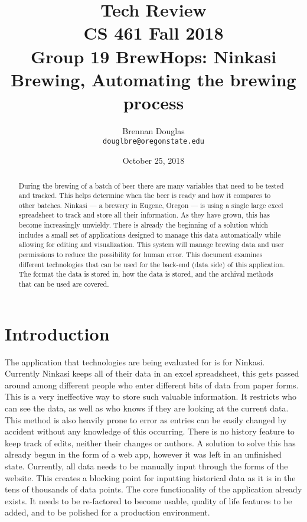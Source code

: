 \documentclass[draftclsnofoot,onecolumn,journal,letterpaper,compsoc,10pt]{IEEEtran}
\title{Tech Review\\\large CS 461 Fall 2018\\Group 19 BrewHops: Ninkasi Brewing, Automating the brewing process}
\author{
    Brennan Douglas \\
    \texttt{douglbre@oregonstate.edu}
}
\date{October 25, 2018}
\begin{document}
\begin{titlingpage}
    \maketitle
    \begin{abstract}
    	During the brewing of a batch of beer there are many variables that need to be tested and tracked. This helps determine when the beer is ready and how it compares to other batches. Ninkasi --- a brewery in Eugene, Oregon --- is using a single large excel spreadsheet to track and store all their information. As they have grown, this has become increasingly unwieldy. There is already the beginning of a solution which includes a small set of applications designed to manage this data automatically while allowing for editing and visualization. This system will manage brewing data and user permissions to reduce the possibility for human error. This document examines different technologies that can be used for the back-end (data side) of this application.  The format the data is stored in, how the data is stored, and the archival methods that can be used are covered.
    \end{abstract}
    \pagebreak
    \tableofcontents
\end{titlingpage}

\section{Introduction}

The application that technologies are being evaluated for is for Ninkasi.  Currently Ninkasi keeps all of their data in an excel spreadsheet, this gets passed around among different people who enter different bits of data from paper forms.  This is a very ineffective way to store such valuable information.  It restricts who can see the data, as well as who knows if they are looking at the current data.  This method is also heavily prone to error as entries can be easily changed by accident without any knowledge of this occurring.  There is no history feature to keep track of edits, neither their changes or authors.  A solution to solve this has already begun in the form of a web app, however it was left in an unfinished state.  Currently, all data needs to be manually input through the forms of the website.  This creates a blocking point for inputting historical data as it is in the tens of thousands of data points.  The core functionality of the application already exists.  It needs to be re-factored to become usable, quality of life features to be added, and to be polished for a production environment.
\end{document}
